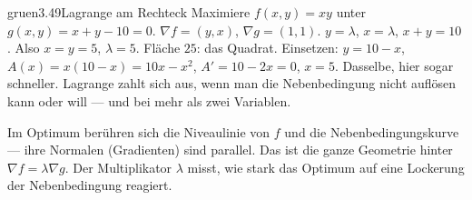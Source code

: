 \begin{loesungkarte}{gruen}{3.49}{Lagrange am Rechteck}
Maximiere $f(x, y) = xy$ unter $g(x, y) = x + y - 10 = 0$. $\nabla f = (y, x)$, $\nabla g = (1, 1)$.
$y = \lambda$, $x = \lambda$, $x + y = 10$. Also $x = y = 5$, $\lambda = 5$. Fläche $25$: das Quadrat.
Einsetzen: $y = 10 - x$, $A(x) = x(10 - x) = 10x - x^{2}$, $A' = 10 - 2x = 0$, $x = 5$. Dasselbe, hier sogar schneller. Lagrange zahlt sich aus, wenn man die Nebenbedingung nicht auflösen kann oder will --- und bei mehr als zwei Variablen.
\begin{mitnehmen}\kastentext
Im Optimum berühren sich die Niveaulinie von $f$ und die Nebenbedingungskurve --- ihre Normalen (Gradienten) sind parallel. Das ist die ganze Geometrie hinter $\nabla f = \lambda\nabla g$. Der Multiplikator $\lambda$ misst, wie stark das Optimum auf eine Lockerung der Nebenbedingung reagiert.
\end{mitnehmen}
\end{loesungkarte}

